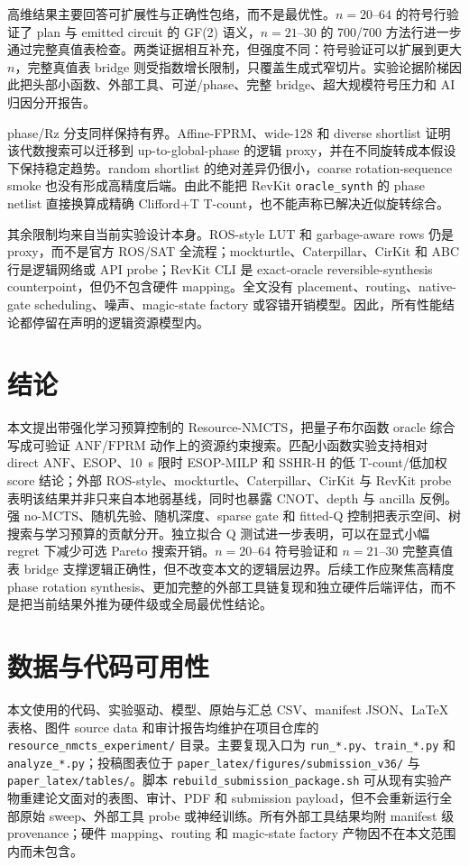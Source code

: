 \documentclass[UTF8,fontset=macnew,11pt]{ctexart}
\newcommand{\method}{Resource-NMCTS}
\newcommand{\anf}{\ensuremath{\mathrm{ANF}}}
\newcommand{\fprm}{\ensuremath{\mathrm{FPRM}}}
\newcommand{\mcts}{\ensuremath{\mathrm{MCTS}}}
\begin{document}
高维结果主要回答可扩展性与正确性包络，而不是最优性。$n=20$--$64$ 的符号行验证了 plan 与 emitted circuit 的 GF(2) 语义，$n=21$--$30$ 的 700/700 方法行进一步通过完整真值表检查。两类证据相互补充，但强度不同：符号验证可以扩展到更大 $n$，完整真值表 bridge 则受指数增长限制，只覆盖生成式窄切片。实验论据阶梯因此把头部小函数、外部工具、可逆/phase、完整 bridge、超大规模符号压力和 AI 归因分开报告。

phase/Rz 分支同样保持有界。Affine-FPRM、wide-128 和 diverse shortlist 证明该代数搜索可以迁移到 up-to-global-phase 的逻辑 proxy，并在不同旋转成本假设下保持稳定趋势。random shortlist 的绝对差异仍很小，coarse rotation-sequence smoke 也没有形成高精度后端。由此不能把 RevKit \texttt{oracle\_synth} 的 phase netlist 直接换算成精确 Clifford+T T-count，也不能声称已解决近似旋转综合。

其余限制均来自当前实验设计本身。ROS-style LUT 和 garbage-aware rows 仍是 proxy，而不是官方 ROS/SAT 全流程；mockturtle、Caterpillar、CirKit 和 ABC 行是逻辑网络或 API probe；RevKit CLI 是 exact-oracle reversible-synthesis counterpoint，但仍不包含硬件 mapping。全文没有 placement、routing、native-gate scheduling、噪声、magic-state factory 或容错开销模型。因此，所有性能结论都停留在声明的逻辑资源模型内。

\section{结论}

本文提出带强化学习预算控制的 \method{}，把量子布尔函数 oracle 综合写成可验证 \anf{}/\fprm{} 动作上的资源约束搜索。匹配小函数实验支持相对 direct \anf{}、ESOP、10~s 限时 ESOP-MILP 和 SSHR-H 的低 T-count/低加权 score 结论；外部 ROS-style、mockturtle、Caterpillar、CirKit 与 RevKit probe 表明该结果并非只来自本地弱基线，同时也暴露 CNOT、depth 与 ancilla 反例。强 no-\mcts{}、随机先验、随机深度、sparse gate 和 fitted-Q 控制把表示空间、树搜索与学习预算的贡献分开。独立拟合 Q 测试进一步表明，可以在显式小幅 regret 下减少可选 Pareto 搜索开销。$n=20$--$64$ 符号验证和 $n=21$--$30$ 完整真值表 bridge 支撑逻辑正确性，但不改变本文的逻辑层边界。后续工作应聚焦高精度 phase rotation synthesis、更加完整的外部工具链复现和独立硬件后端评估，而不是把当前结果外推为硬件级或全局最优性结论。

\section*{数据与代码可用性}

本文使用的代码、实验驱动、模型、原始与汇总 CSV、manifest JSON、LaTeX 表格、图件 source data 和审计报告均维护在项目仓库的 \texttt{resource\_nmcts\_experiment/} 目录。主要复现入口为 \texttt{run\_*.py}、\texttt{train\_*.py} 和 \texttt{analyze\_*.py}；投稿图表位于 \texttt{paper\_latex/figures/submission\_v36/} 与 \texttt{paper\_latex/tables/}。脚本 \texttt{rebuild\_submission\_package.sh} 可从现有实验产物重建论文面对的表图、审计、PDF 和 submission payload，但不会重新运行全部原始 sweep、外部工具 probe 或神经训练。所有外部工具结果均附 manifest 级 provenance；硬件 mapping、routing 和 magic-state factory 产物因不在本文范围内而未包含。
\end{document}
